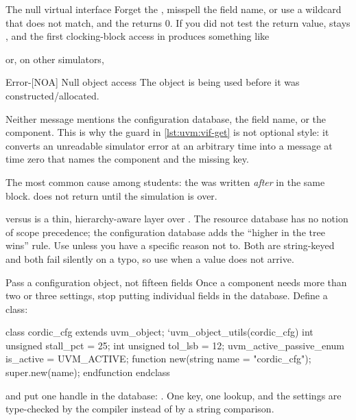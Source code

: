 \begin{gotcha}{The null virtual interface}
Forget the , misspell the field name, or use a wildcard that does
not match, and the  returns 0. If you did not test the return
value,  stays , and the first clocking-block access in
 produces something like


or, on other simulators,

\begin{txtcode}
Error-[NOA] Null object access
  The object is being used before it was constructed/allocated.
\end{txtcode}

Neither message mentions the configuration database, the field name, or the
component. This is why the  guard in
\cref{lst:uvm:vif-get} is not optional style: it converts an unreadable
simulator error at an arbitrary time into a message at time zero that names
the component and the missing key.

The most common cause among students: the  was written
\emph{after}  in the same  block.
 does not return until the simulation is over.
\end{gotcha}

\begin{notebox}{ versus }
 is a thin, hierarchy-aware layer over
. The resource database has no notion of scope
precedence; the configuration database adds the ``higher in the tree wins''
rule. Use  unless you have a specific reason not to.
Both are string-keyed and both fail silently on a typo, so use
 when a value does not arrive.
\end{notebox}

\begin{tipbox}{Pass a configuration object, not fifteen fields}
Once a component needs more than two or three settings, stop putting
individual fields in the database. Define a class:

\begin{uvmcode}
class cordic_cfg extends uvm_object;
  `uvm_object_utils(cordic_cfg)
  int unsigned          stall_pct  = 25;
  int unsigned          tol_lsb    = 12;
  uvm_active_passive_enum is_active = UVM_ACTIVE;
  function new(string name = "cordic_cfg"); super.new(name); endfunction
endclass
\end{uvmcode}

and put one handle in the database:
.
One key, one lookup, and the settings are type-checked by the compiler
instead of by a string comparison.
\end{tipbox}

